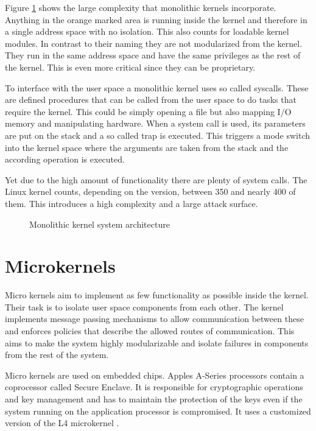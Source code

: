 \documentclass[
a4paper,
11pt,
twoside
]{report}
\begin{document}
		Figure \ref{monolithickernel} shows the large complexity that monolithic kernels incorporate.
		Anything in the orange marked area is running inside the kernel and therefore in a single address space with no isolation.
		This also counts for loadable kernel modules.
		In contrast to their naming they are not modularized from the kernel.
		They run in the same address space and have the same privileges as the rest of the kernel.
		This is even more critical since they can be proprietary.
		
		To interface with the user space a monolithic kernel uses so called syscalls.
		These are defined procedures that can be called from the user space to do tasks that require the kernel.
		This could be simply opening a file but also mapping I/O memory and manipulating hardware.
		When a system call is used, its parameters are put on the stack and a so called trap is executed.
		This triggers a mode switch into the kernel space where the arguments are taken from the stack and the according operation is executed. \citep{Tanenbaum2001}
		
		Yet due to the high amount of functionality there are plenty of system calls.
		The Linux kernel counts, depending on the version, between 350 \citep{journals/jss/IsraeliF10} and nearly 400 \citep{syscalls} of them.
		This introduces a high complexity and a large attack surface.
		
		
		\begin{figure}
			\centering
			\def\svgwidth{0.8\textwidth}
			
			\caption{Monolithic kernel system architecture}
			\label{monolithickernel}    
		\end{figure}
		
		\section{Microkernels}
		
		Micro kernels aim to implement as few functionality as possible inside the kernel.
		Their task is to isolate user space components from each other.
		The kernel implements message passing mechanisms to allow communication between these and enforces policies that describe the allowed routes of communication.
		This aims to make the system highly modularizable and isolate failures in components from the rest of the system.
		
		Micro kernels are used on embedded chips.
		Apples A-Series processors contain a coprocessor called Secure Enclave.
		It is responsible for cryptographic operations and key management and has to maintain the protection of the keys even if the system running on the application processor is compromised.
		It uses a customized version of the L4 microkernel \citep{ios11sec} \citep{Heiser:2016:LML:2912578.2893177}.
		
\end{document}
